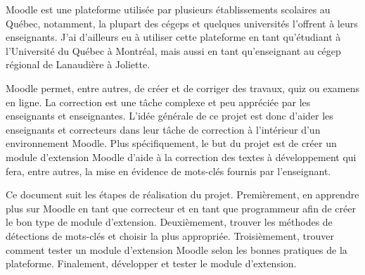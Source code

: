 \begin{introduction}

Moodle est une plateforme utilisée par plusieurs établissements scolaires au Québec, notamment, la plupart des cégeps et quelques universités l'offrent à leurs enseignants.
J'ai d'ailleurs eu à utiliser cette plateforme en tant qu'étudiant à l'Université du Québec à Montréal, mais aussi en tant qu'enseignant au cégep régional de Lanaudière à Joliette.

Moodle permet, entre autres, de créer et de corriger des travaux, quiz ou examens en ligne.
La correction est une tâche complexe et peu appréciée par les enseignants et enseignantes.
L'idée générale de ce projet est donc d'aider les enseignants et correcteurs dans leur tâche de correction à l'intérieur d'un environnement Moodle.
Plus sp\'ecifiquement, le but du projet est de créer un module d'extension Moodle d'aide à la correction des textes à développement qui fera, entre autres, la mise en évidence de mots-clés fournis par l'enseignant.

Ce document suit les étapes de réalisation du projet.
Premièrement, en apprendre plus sur Moodle en tant que correcteur et en tant que programmeur afin de créer le bon type de module d'extension.
Deuxièmement, trouver les méthodes de détections de mots-clés et choisir la plus appropri\'ee.
Troisièmement, trouver comment tester un module d'extension Moodle selon les bonnes pratiques de la plateforme.
Finalement, développer et tester le module d'extension.

\end{introduction}
